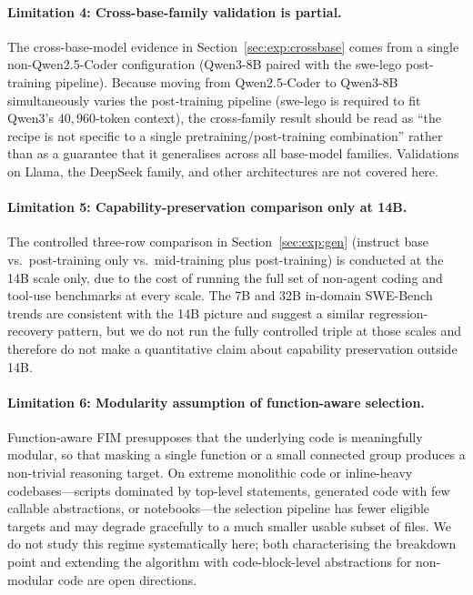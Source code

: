 \paragraph{Limitation 4: Cross-base-family validation is partial.}
The cross-base-model evidence in Section~\ref{sec:exp:crossbase} comes
from a single non-Qwen2.5-Coder configuration (Qwen3-8B paired with the
swe-lego post-training pipeline). Because moving from Qwen2.5-Coder to
Qwen3-8B simultaneously varies the post-training pipeline (swe-lego is
required to fit Qwen3's $40{,}960$-token context), the cross-family
result should be read as ``the recipe is not specific to a single
pretraining/post-training combination'' rather than as a guarantee that
it generalises across all base-model families. Validations on Llama, the
DeepSeek family, and other architectures are not covered here.

\paragraph{Limitation 5: Capability-preservation comparison only at 14B.}
The controlled three-row comparison in Section~\ref{sec:exp:gen}
(instruct base vs.\ post-training only vs.\ mid-training plus
post-training) is conducted at the 14B scale only, due to the cost of
running the full set of non-agent coding and tool-use benchmarks at
every scale. The 7B and 32B in-domain SWE-Bench trends are consistent
with the 14B picture and suggest a similar regression-recovery pattern,
but we do not run the fully controlled triple at those scales and
therefore do not make a quantitative claim about capability preservation
outside 14B.

\paragraph{Limitation 6: Modularity assumption of function-aware selection.}
Function-aware FIM presupposes that the underlying code is meaningfully
modular, so that masking a single function or a small connected group
produces a non-trivial reasoning target. On extreme monolithic code or
inline-heavy codebases---scripts dominated by top-level statements,
generated code with few callable abstractions, or notebooks---the
selection pipeline has fewer eligible targets and may degrade
gracefully to a much smaller usable subset of files. We do not study
this regime systematically here; both characterising the breakdown point
and extending the algorithm with code-block-level abstractions for
non-modular code are open directions.
